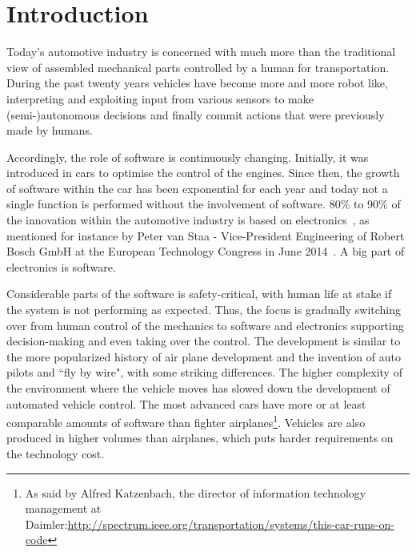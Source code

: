 \documentclass[preprint,12pt,3p]{elsarticle}
\newcommand\patrizio[1]{\nb{Patrizio}{#1}}
\newcommand\eric[1]{\nb{Eric}{#1}}
\begin{document}

\section{Introduction}
\label{sec:intro}
Today's automotive industry is concerned with much more than the traditional view of assembled
mechanical parts controlled by a human for transportation. During the past
twenty years vehicles have become more and more robot like, interpreting and
exploiting input from various sensors to make (semi-)autonomous decisions and finally commit
actions that were previously made by humans.  

Accordingly, the role of software is continuously changing. Initially, it was introduced in cars to optimise the
control of the engines. Since then, the growth of software within the car has
been exponential for each year and today not a single function is performed
without the involvement of software. 
80\% to 90\% of the innovation within the automotive industry is based on electronics~\cite{Peter2014}, 
as mentioned for instance by Peter van Staa - Vice-President Engineering of Robert Bosch GmbH at the European Technology Congress in June 2014~\cite{Peter2014}. 
A big part of electronics is software.

Considerable parts of the
software is safety-critical, with human life at stake if the system is not performing as
expected. Thus, the focus is gradually switching over from human control of the
mechanics to software and electronics supporting decision-making and even taking
over the control. 
The development is similar to the more popularized history of
air plane development and the invention of auto pilots and ``fly by wire", with
some striking differences. The higher complexity of the environment where the
vehicle moves has slowed down the development of automated vehicle control. The
most advanced cars have more or at least comparable amounts of software than fighter
airplanes\footnote{As said by Alfred Katzenbach, the director of information technology management at Daimler:\url{http://spectrum.ieee.org/transportation/systems/this-car-runs-on-code}}. 
Vehicles are also produced in higher volumes than airplanes, which puts harder requirements on the technology cost.
\end{document}
